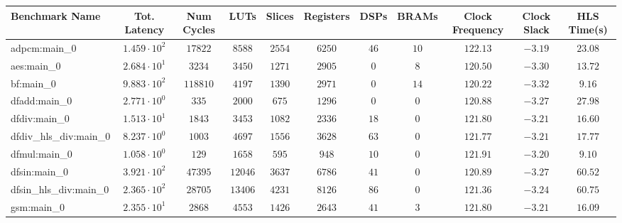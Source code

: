 \begin{tabular}{|l|c|c|c|c|c|c|c|c|c|c|}
\hline
Benchmark Name          & Tot. Latency           & Num Cycles & LUTs      & Slices    & Registers & DSPs    & BRAMs   & Clock Frequency & Clock Slack & HLS Time(s) \\
\hline
adpcm:main\_0           & $ 1.459 \cdot 10^{2} $ & $ 17822  $ & $ 8588  $ & $ 2554  $ & $ 6250  $ & $ 46  $ & $ 10  $ & $ 122.13      $ & $ -3.19   $ & $ 23.08   $ \\
aes:main\_0             & $ 2.684 \cdot 10^{1} $ & $ 3234   $ & $ 3450  $ & $ 1271  $ & $ 2905  $ & $ 0   $ & $ 8   $ & $ 120.50      $ & $ -3.30   $ & $ 13.72   $ \\
bf:main\_0              & $ 9.883 \cdot 10^{2} $ & $ 118810 $ & $ 4197  $ & $ 1390  $ & $ 2971  $ & $ 0   $ & $ 14  $ & $ 120.22      $ & $ -3.32   $ & $ 9.16    $ \\
dfadd:main\_0           & $ 2.771 \cdot 10^{0} $ & $ 335    $ & $ 2000  $ & $ 675   $ & $ 1296  $ & $ 0   $ & $ 0   $ & $ 120.88      $ & $ -3.27   $ & $ 27.98   $ \\
dfdiv:main\_0           & $ 1.513 \cdot 10^{1} $ & $ 1843   $ & $ 3453  $ & $ 1082  $ & $ 2336  $ & $ 18  $ & $ 0   $ & $ 121.80      $ & $ -3.21   $ & $ 16.60   $ \\
dfdiv\_hls\_div:main\_0 & $ 8.237 \cdot 10^{0} $ & $ 1003   $ & $ 4697  $ & $ 1556  $ & $ 3628  $ & $ 63  $ & $ 0   $ & $ 121.77      $ & $ -3.21   $ & $ 17.77   $ \\
dfmul:main\_0           & $ 1.058 \cdot 10^{0} $ & $ 129    $ & $ 1658  $ & $ 595   $ & $ 948   $ & $ 10  $ & $ 0   $ & $ 121.91      $ & $ -3.20   $ & $ 9.10    $ \\
dfsin:main\_0           & $ 3.921 \cdot 10^{2} $ & $ 47395  $ & $ 12046 $ & $ 3637  $ & $ 6786  $ & $ 41  $ & $ 0   $ & $ 120.89      $ & $ -3.27   $ & $ 60.52   $ \\
dfsin\_hls\_div:main\_0 & $ 2.365 \cdot 10^{2} $ & $ 28705  $ & $ 13406 $ & $ 4231  $ & $ 8126  $ & $ 86  $ & $ 0   $ & $ 121.36      $ & $ -3.24   $ & $ 60.75   $ \\
gsm:main\_0             & $ 2.355 \cdot 10^{1} $ & $ 2868   $ & $ 4553  $ & $ 1426  $ & $ 2643  $ & $ 41  $ & $ 3   $ & $ 121.80      $ & $ -3.21   $ & $ 16.09   $ \\

\end{tabular}
